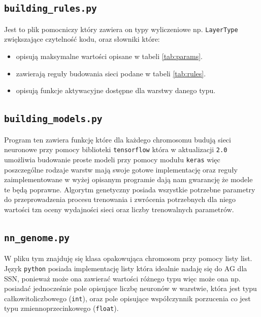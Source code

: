 \documentclass{article}
\begin{document}
\subsection{\texttt{building\_rules.py}}
Jest to plik pomocniczy który zawiera on typy wyliczeniowe np. \texttt{LayerType}
zwiększające czytelność kodu, oraz słowniki które:
\begin{itemize}
\item opisują maksymalne wartości opisane w tabeli \ref{tab:params}.
\item zawierają reguły budowania sieci podane w tabeli \ref{tab:rules}.
\item opisują funkcje aktywacyjne dostępne dla warstwy danego typu.
\end{itemize}
\subsection{\texttt{building\_models.py}}
Program ten zawiera funkcję które dla każdego chromosomu budują sieci neuronowe 
przy pomocy biblioteki \texttt{tensorflow} która w aktualizacji \texttt{2.0}
umożliwia budowanie proste modeli przy pomocy modułu \texttt{keras} więc poszczególne 
rodzaje warstw mają swoje gotowe implementację oraz reguły zaimplementowane w wyżej opisanym
programie dają nam gwarancję że modele te będą poprawne. Algorytm genetyczny posiada wszystkie
potrzebne parametry do przeprowadzenia procesu trenowania i zwrócenia potrzebnych dla niego
wartości tzn oceny wydajności sieci oraz liczby trenowalnych parametrów.
\subsection{\texttt{nn\_genome.py}}
W pliku tym znajduję się klasa opakowująca chromosom przy pomocy listy list.
Język \texttt{python} posiada implementację listy która idealnie nadaję się do AG dla SSN, 
ponieważ może ona zawierać wartości różnego typu więc może ona np. posiadać jednocześnie
pole opisujące liczbę neuronów w warstwie, która jest typu całkowitoliczbowego (\texttt{int}),
oraz pole opisujące współczynnik porzucenia co jest typu zmiennoprzecinkowego 
(\texttt{float}).
\end{document}
